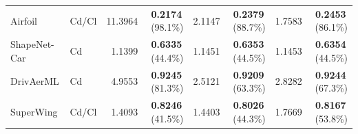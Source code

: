 \begin{table}[!htbp]
\begin{tabular}{@{}llrrrrrr@{}}
Airfoil & Cd/Cl & 11.3964 & \textbf{0.2174}\,{\footnotesize (98.1\%)} & 2.1147 & \textbf{0.2379}\,{\footnotesize (88.7\%)} & 1.7583 & \textbf{0.2453}\,{\footnotesize (86.1\%)} \\
ShapeNet-Car & Cd & 1.1399 & \textbf{0.6335}\,{\footnotesize (44.4\%)} & 1.1451 & \textbf{0.6353}\,{\footnotesize (44.5\%)} & 1.1453 & \textbf{0.6354}\,{\footnotesize (44.5\%)} \\
DrivAerML & Cd & 4.9553 & \textbf{0.9245}\,{\footnotesize (81.3\%)} & 2.5121 & \textbf{0.9209}\,{\footnotesize (63.3\%)} & 2.8282 & \textbf{0.9244}\,{\footnotesize (67.3\%)} \\
SuperWing & Cd/Cl & 1.4093 & \textbf{0.8246}\,{\footnotesize (41.5\%)} & 1.4403 & \textbf{0.8026}\,{\footnotesize (44.3\%)} & 1.7669 & \textbf{0.8167}\,{\footnotesize (53.8\%)} \\
\bottomrule
\end{tabular}
\end{table}
